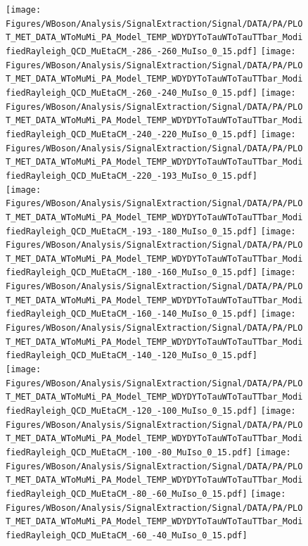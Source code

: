 \begin{figure}[!h]
\begin{center}
\begin{tiny}
\texttt{[image: Figures/WBoson/Analysis/SignalExtraction/Signal/DATA/PA/PLOT\_MET\_DATA\_WToMuMi\_PA\_Model\_TEMP\_WDYDYToTauWToTauTTbar\_ModifiedRayleigh\_QCD\_MuEtaCM\_-286\_-260\_MuIso\_0\_15.pdf]}
\texttt{[image: Figures/WBoson/Analysis/SignalExtraction/Signal/DATA/PA/PLOT\_MET\_DATA\_WToMuMi\_PA\_Model\_TEMP\_WDYDYToTauWToTauTTbar\_ModifiedRayleigh\_QCD\_MuEtaCM\_-260\_-240\_MuIso\_0\_15.pdf]}
\texttt{[image: Figures/WBoson/Analysis/SignalExtraction/Signal/DATA/PA/PLOT\_MET\_DATA\_WToMuMi\_PA\_Model\_TEMP\_WDYDYToTauWToTauTTbar\_ModifiedRayleigh\_QCD\_MuEtaCM\_-240\_-220\_MuIso\_0\_15.pdf]}
\texttt{[image: Figures/WBoson/Analysis/SignalExtraction/Signal/DATA/PA/PLOT\_MET\_DATA\_WToMuMi\_PA\_Model\_TEMP\_WDYDYToTauWToTauTTbar\_ModifiedRayleigh\_QCD\_MuEtaCM\_-220\_-193\_MuIso\_0\_15.pdf]}
\\
\texttt{[image: Figures/WBoson/Analysis/SignalExtraction/Signal/DATA/PA/PLOT\_MET\_DATA\_WToMuMi\_PA\_Model\_TEMP\_WDYDYToTauWToTauTTbar\_ModifiedRayleigh\_QCD\_MuEtaCM\_-193\_-180\_MuIso\_0\_15.pdf]}
\texttt{[image: Figures/WBoson/Analysis/SignalExtraction/Signal/DATA/PA/PLOT\_MET\_DATA\_WToMuMi\_PA\_Model\_TEMP\_WDYDYToTauWToTauTTbar\_ModifiedRayleigh\_QCD\_MuEtaCM\_-180\_-160\_MuIso\_0\_15.pdf]}
\texttt{[image: Figures/WBoson/Analysis/SignalExtraction/Signal/DATA/PA/PLOT\_MET\_DATA\_WToMuMi\_PA\_Model\_TEMP\_WDYDYToTauWToTauTTbar\_ModifiedRayleigh\_QCD\_MuEtaCM\_-160\_-140\_MuIso\_0\_15.pdf]}
\texttt{[image: Figures/WBoson/Analysis/SignalExtraction/Signal/DATA/PA/PLOT\_MET\_DATA\_WToMuMi\_PA\_Model\_TEMP\_WDYDYToTauWToTauTTbar\_ModifiedRayleigh\_QCD\_MuEtaCM\_-140\_-120\_MuIso\_0\_15.pdf]}
\\
\texttt{[image: Figures/WBoson/Analysis/SignalExtraction/Signal/DATA/PA/PLOT\_MET\_DATA\_WToMuMi\_PA\_Model\_TEMP\_WDYDYToTauWToTauTTbar\_ModifiedRayleigh\_QCD\_MuEtaCM\_-120\_-100\_MuIso\_0\_15.pdf]}
\texttt{[image: Figures/WBoson/Analysis/SignalExtraction/Signal/DATA/PA/PLOT\_MET\_DATA\_WToMuMi\_PA\_Model\_TEMP\_WDYDYToTauWToTauTTbar\_ModifiedRayleigh\_QCD\_MuEtaCM\_-100\_-80\_MuIso\_0\_15.pdf]}
\texttt{[image: Figures/WBoson/Analysis/SignalExtraction/Signal/DATA/PA/PLOT\_MET\_DATA\_WToMuMi\_PA\_Model\_TEMP\_WDYDYToTauWToTauTTbar\_ModifiedRayleigh\_QCD\_MuEtaCM\_-80\_-60\_MuIso\_0\_15.pdf]}
\texttt{[image: Figures/WBoson/Analysis/SignalExtraction/Signal/DATA/PA/PLOT\_MET\_DATA\_WToMuMi\_PA\_Model\_TEMP\_WDYDYToTauWToTauTTbar\_ModifiedRayleigh\_QCD\_MuEtaCM\_-60\_-40\_MuIso\_0\_15.pdf]}

\end{tiny}
\end{center}
\end{figure}
